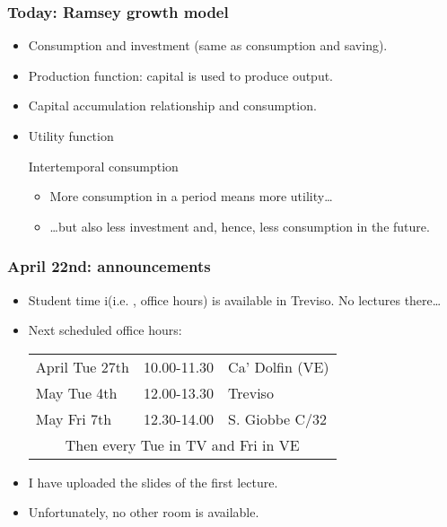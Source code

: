 \documentclass[ps,CFframes_inst]{beamer}
\begin{document}
\begin{frame}
    \frametitle{Today: Ramsey growth model} 
    \begin{itemize}
	\item Consumption and investment (same as consumption and 
	saving).
	
	\item Production function: capital is used to produce output.
	
	\item Capital accumulation relationship and consumption.
	
	\item Utility function

	\begin{alertblock}{Intertemporal consumption}
	    \begin{itemize}
		\item More consumption in a period means more utility\ldots
		
		\item \ldots but also less investment and, hence, 
		less consumption in the future.
	    \end{itemize}
       \end{alertblock}	    

    
    \end{itemize}
\end{frame}

\begin{frame}
    \frametitle{April 22nd: announcements} 
    \begin{itemize}
	\item Student time i(i.e. , office hours) is available in 
	Treviso. No lectures there\ldots
	
	\item Next scheduled office hours:\bigskip
	
	\begin{tabular}{lcl}
	    
	    April Tue 27th & 10.00-11.30 & Ca' Dolfin (VE)  \\
	    
	    May Tue 4th & 12.00-13.30 & Treviso  \\
	    
	    May Fri 7th & 12.30-14.00 & S. Giobbe C/32  \\
	    \hline
	    
	    \multicolumn{3}{c}{Then every Tue in TV and Fri in VE}\\
	     
	\end{tabular}
	
	\item I have uploaded the slides of the first lecture.
	
	\item Unfortunately, no other room is available.
    
    \end{itemize}
\end{frame}
\end{document}
